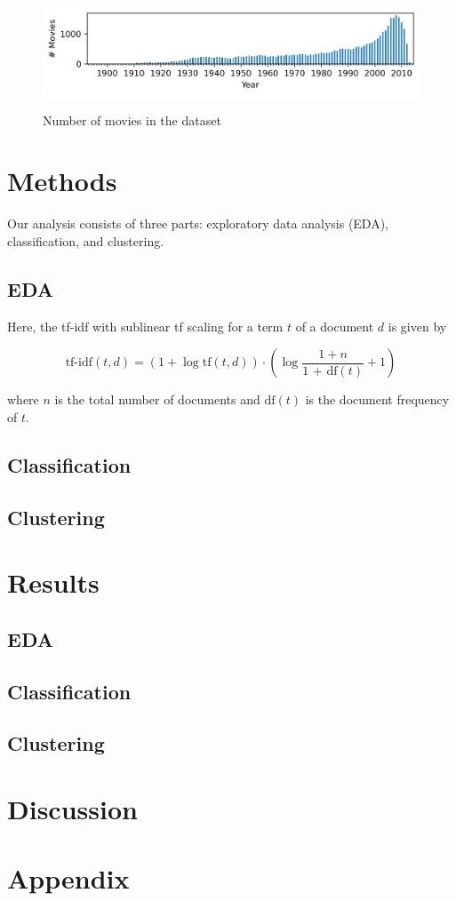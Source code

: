 \documentclass[hidelinks]{article}
\begin{document}
\begin{multicols}{2}
\begin{figure}
\centering
\caption{Number of movies in the dataset}
\includegraphics[width=5.5in]{figures/number_movies_per_year_bar_chart.png}
\label{figure:number_movies_per_year_bar_chart}
\end{figure}

\section{Methods}
Our analysis consists of three parts: exploratory data analysis (EDA), classification, and clustering.
\subsection{EDA}
Here, the tf-idf with sublinear tf scaling for a term $t$ of a document $d$ is given by

$$\text{tf-idf}(t, d) = (1 + \log\text{tf}(t, d)) \cdot \left(\log\frac{1 + n}{\text{1 + df}(t)} + 1\right)$$

where $n$ is the total number of documents and $\text{df}(t)$ is the document frequency of $t$.
\subsection{Classification}
\subsection{Clustering}

\section{Results}
\subsection{EDA}
\subsection{Classification}
\subsection{Clustering}

\section{Discussion}
\end{multicols}

\nocite{10.1145/2723372.2751523}



\section{Appendix}
\end{document}
